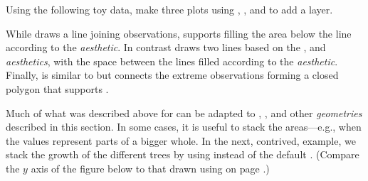 \documentclass[krantz2]{krantz}\usepackage{knitr}
\begin{document}
\begin{playground}
Using the following toy data, make three plots using , , and  to add a layer.

\begin{knitrout}\footnotesize
{}\color{fgcolor}\begin{kframe}
\begin{alltt}
 \hlkwb{<-} \hlstd{(} \hlstd{=} \hlstd{(}\hlstd{,}\hlstd{,}\hlstd{,}\hlstd{),}  \hlstd{=} \hlstd{(}\hlstd{,}\hlstd{,}\hlstd{,}\hlstd{))}
\end{alltt}
\end{kframe}
\end{knitrout}
\end{playground}

While  draws a line joining observations,  supports filling the area below the line according to the  \emph{aesthetic}. In contrast  draws two lines based on the ,  and  \emph{aesthetics}, with the space between the lines filled according to the  \emph{aesthetic}. Finally,  is similar to  but connects the extreme observations forming a closed polygon that supports .

Much of what was described above for  can be adapted to , ,   and other \emph{geometries} described in this section. In some cases, it is useful to stack the areas---e.g.,  when the values represent parts of a bigger whole. In the next, contrived, example, we stack the growth of the different trees by using  instead of the default . (Compare the $y$ axis of the figure below to that drawn using  on page \pageref{plot:fig:lines}.)
\end{document}
